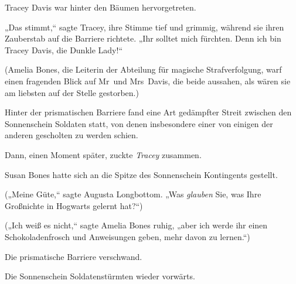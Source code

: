 Tracey Davis war hinter den Bäumen hervorgetreten.

„Das stimmt,“ sagte Tracey, ihre Stimme tief und grimmig, während sie ihren Zauberstab auf die Barriere richtete. „Ihr solltet mich fürchten. Denn ich bin Tracey Davis, die Dunkle Lady!“

(Amelia Bones, die Leiterin der Abteilung für magische Strafverfolgung, warf einen fragenden Blick auf Mr~und Mrs~Davis, die beide aussahen, als wären sie am liebsten auf der Stelle gestorben.)

Hinter der prismatischen Barriere fand eine Art gedämpfter Streit zwischen den Sonnenschein Soldaten statt, von denen insbesondere einer von einigen der anderen gescholten zu werden schien.

Dann, einen Moment später, zuckte \emph{Tracey} zusammen.

Susan Bones hatte sich an die Spitze des Sonnenschein Kontingents gestellt.

(„Meine Güte,“ sagte Augusta Longbottom. „Was \emph{glauben} Sie, was Ihre Großnichte in Hogwarts gelernt hat?“)

(„Ich weiß es nicht,“ sagte Amelia Bones ruhig, „aber ich werde ihr einen Schokoladenfrosch und Anweisungen geben, mehr davon zu lernen.“)

Die prismatische Barriere verschwand.

Die Sonnenschein Soldatenstürmten wieder vorwärts.

